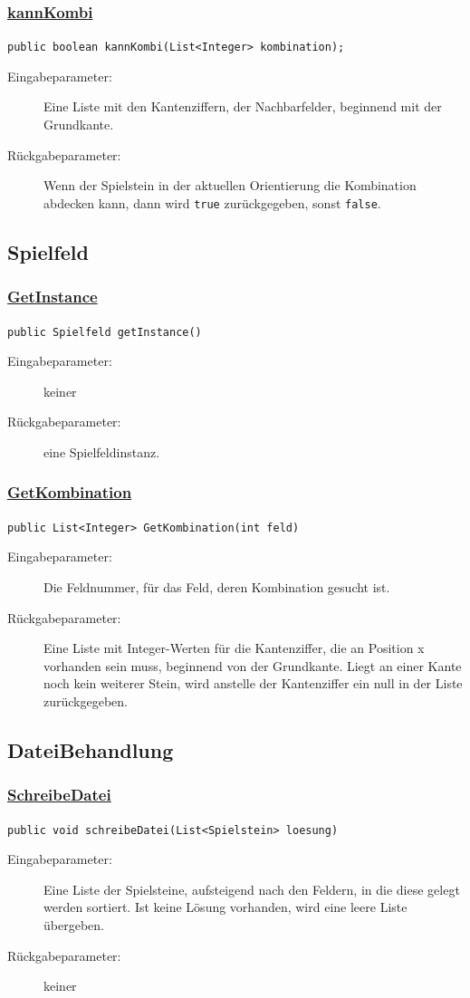 \subsubsection{\underline{kannKombi}}
\lstinline{public boolean kannKombi(List<Integer> kombination);}
\begin{description}
    \item [Eingabeparameter:] Eine Liste mit den Kantenziffern, der Nachbarfelder, beginnend mit der Grundkante.
    \item [Rückgabeparameter:] Wenn der Spielstein in der aktuellen Orientierung die Kombination abdecken kann, dann wird \lstinline{true} zurückgegeben, sonst \lstinline{false}.
\end{description}

\subsection{Spielfeld}
\subsubsection{\underline{GetInstance}}
\lstinline{public Spielfeld getInstance()}
\begin{description}
	\item [Eingabeparameter:] keiner
	\item [Rückgabeparameter:] eine Spielfeldinstanz.
\end{description}

\subsubsection{\underline{GetKombination}}
\lstinline{public List<Integer> GetKombination(int feld)}
\begin{description}
	\item [Eingabeparameter:] Die Feldnummer, für das Feld, deren Kombination gesucht ist.
	\item [Rückgabeparameter:] Eine Liste mit Integer-Werten für die Kantenziffer, die an Position x vorhanden sein muss, beginnend von der Grundkante. Liegt an einer Kante noch kein weiterer Stein, wird anstelle der Kantenziffer ein null in der Liste zurückgegeben.
\end{description}

\subsection{DateiBehandlung}
\subsubsection{\underline{SchreibeDatei}}
\lstinline{public void schreibeDatei(List<Spielstein> loesung)}
\begin{description}
	\item [Eingabeparameter:] Eine Liste der Spielsteine, aufsteigend nach den Feldern, in die diese gelegt werden sortiert. Ist keine Lösung vorhanden, wird eine leere Liste übergeben.
	\item [Rückgabeparameter:] keiner
\end{description}

